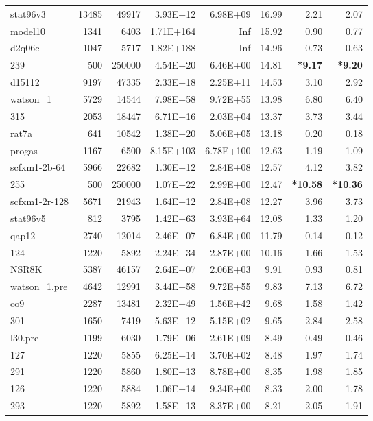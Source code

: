 \documentclass[10pt]{article}
\newcommand{\red}{
	\color{red}	
	}
\begin{document}
\begin{longtable}{|l|r|r|r|r|r|r|r|}
stat96v3	&	13485	&	49917	&	3.93E+12	&	6.98E+09	&	16.99	&	2.21	&	2.07	\\
model10	&	1341	&	6403	&	1.71E+164	&	Inf	&	15.92	&	0.90	&	0.77	\\
d2q06c	&	1047	&	5717	&	1.82E+188	&	Inf	&	14.96	&	0.73	&	0.63	\\
239	&	500	&	250000	&	4.54E+20	&	6.46E+00	&	14.81	&	{\bf \red *9.17}	&	{\bf \red *9.20} 	\\
d15112	&	9197	&	47335	&	2.33E+18	&	2.25E+11	&	14.53	&	3.10	&	2.92	\\
watson\_1	&	5729	&	14544	&	7.98E+58	&	9.72E+55	&	13.98	&	6.80	&	6.40	\\
315	&	2053	&	18447	&	6.71E+16	&	2.03E+04	&	13.37	&	3.73	&	3.44	\\
rat7a	&	641	&	10542	&	1.38E+20	&	5.06E+05	&	13.18	&	0.20	&	0.18	\\
progas	&	1167	&	6500	&	8.15E+103	&	6.78E+100	&	12.63	&	1.19	&	1.09	\\
scfxm1-2b-64	&	5966	&	22682	&	1.30E+12	&	2.84E+08	&	12.57	&	4.12	&	3.82	\\
255	&	500	&	250000	&	1.07E+22	&	2.99E+00	&	12.47	&	{\bf \red *10.58}	&	{\bf \red *10.36} 	\\
scfxm1-2r-128	&	5671	&	21943	&	1.64E+12	&	2.84E+08	&	12.27	&	3.96	&	3.73	\\
stat96v5	&	812	&	3795	&	1.42E+63	&	3.93E+64	&	12.08	&	1.33	&	1.20	\\
qap12	&	2740	&	12014	&	2.46E+07	&	6.84E+00	&	11.79	&	0.14	&	0.12	\\
124	&	1220	&	5892	&	2.24E+34	&	2.87E+00	&	10.16	&	1.66	&	1.53	\\
NSR8K	&	5387	&	46157	&	2.64E+07	&	2.06E+03	&	9.91	&	0.93	&	0.81	\\
watson\_1.pre	&	4642	&	12991	&	3.44E+58	&	9.72E+55	&	9.83	&	7.13	&	6.72	\\
co9	&	2287	&	13481	&	2.32E+49	&	1.56E+42	&	9.68	&	1.58	&	1.42	\\
301	&	1650	&	7419	&	5.63E+12	&	5.15E+02	&	9.65	&	2.84	&	2.58	\\
l30.pre	&	1199	&	6030	&	1.79E+06	&	2.61E+09	&	8.49	&	0.49	&	0.46	\\
127	&	1220	&	5855	&	6.25E+14	&	3.70E+02	&	8.48	&	1.97	&	1.74	\\
291	&	1220	&	5860	&	1.80E+13	&	8.78E+00	&	8.35	&	1.98	&	1.85	\\
126	&	1220	&	5884	&	1.06E+14	&	9.34E+00	&	8.33	&	2.00	&	1.78	\\
293	&	1220	&	5892	&	1.58E+13	&	8.37E+00	&	8.21	&	2.05	&	1.91	\\

\end{longtable}
\end{document}

